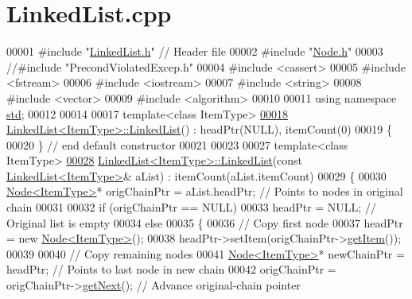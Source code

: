 \hypertarget{LinkedList_8cpp_source}{}\section{Linked\+List.\+cpp}

\begin{DoxyCode}
00001 \textcolor{preprocessor}{#include "\hyperlink{LinkedList_8h}{LinkedList.h}"}  \textcolor{comment}{// Header file}
00002 \textcolor{preprocessor}{#include "\hyperlink{Node_8h}{Node.h}"}
00003 \textcolor{comment}{//#include "PrecondViolatedExcep.h"}
00004 \textcolor{preprocessor}{#include <cassert>}
00005 \textcolor{preprocessor}{#include <fstream>}
00006 \textcolor{preprocessor}{#include <iostream>}
00007 \textcolor{preprocessor}{#include <string>}
00008 \textcolor{preprocessor}{#include <vector>}
00009 \textcolor{preprocessor}{#include <algorithm>}
00010   
00011 \textcolor{keyword}{using namespace }\hyperlink{namespacestd}{std};
00012 
00014 
00017 \textcolor{keyword}{template}<\textcolor{keyword}{class} ItemType>
\hyperlink{classLinkedList_adf8d8164e06b6d358a36df7e53e814ee}{00018} \hyperlink{classLinkedList_adf8d8164e06b6d358a36df7e53e814ee}{LinkedList<ItemType>::LinkedList}() : headPtr(NULL), itemCount(0)
00019 \{
00020 \}  \textcolor{comment}{// end default constructor}
00021 
00023 
00027 \textcolor{keyword}{template}<\textcolor{keyword}{class} ItemType>
\hyperlink{classLinkedList_a6f1443c6120352f1f5b6bd3c0d95e41e}{00028} \hyperlink{classLinkedList_adf8d8164e06b6d358a36df7e53e814ee}{LinkedList<ItemType>::LinkedList}(\textcolor{keyword}{const} 
      \hyperlink{classLinkedList}{LinkedList<ItemType>}& aList) : itemCount(aList.itemCount)
00029 \{
00030    \hyperlink{classNode}{Node<ItemType>}* origChainPtr = aList.headPtr;  \textcolor{comment}{// Points to nodes in original chain}
00031 
00032    \textcolor{keywordflow}{if} (origChainPtr == NULL)
00033       headPtr = NULL;  \textcolor{comment}{// Original list is empty}
00034    \textcolor{keywordflow}{else}
00035    \{
00036       \textcolor{comment}{// Copy first node}
00037       headPtr = \textcolor{keyword}{new} \hyperlink{classNode}{Node<ItemType>}();
00038       headPtr->setItem(origChainPtr->\hyperlink{classNode_a6c08caef312b6f2f69b5e090cf047514}{getItem}());
00039       
00040       \textcolor{comment}{// Copy remaining nodes}
00041       \hyperlink{classNode}{Node<ItemType>}* newChainPtr = headPtr;      \textcolor{comment}{// Points to last node in new chain}
00042       origChainPtr = origChainPtr->\hyperlink{classNode_a3eb0c96e03a3fd46ea1cff4c305bbedd}{getNext}();     \textcolor{comment}{// Advance original-chain pointer}

\end{DoxyCode}
